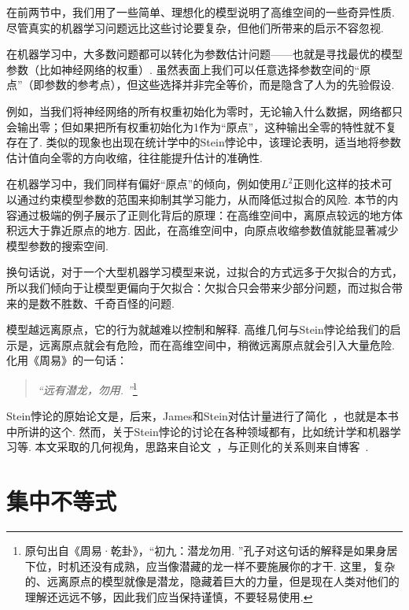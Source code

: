 在前两节中，我们用了一些简单、理想化的模型说明了高维空间的一些奇异性质. 尽管真实的机器学习问题远比这些讨论要复杂，但他们所带来的启示不容忽视. 

在机器学习中，大多数问题都可以转化为参数估计问题——也就是寻找最优的模型参数（比如神经网络的权重）. 虽然表面上我们可以任意选择参数空间的“原点”（即参数的参考点），但这些选择并非完全等价，而是隐含了人为的先验假设. 

例如，当我们将神经网络的所有权重初始化为零时，无论输入什么数据，网络都只会输出零；但如果把所有权重初始化为1作为“原点”，这种输出全零的特性就不复存在了. 类似的现象也出现在统计学中的Stein悖论中，该理论表明，适当地将参数估计值向全零的方向收缩，往往能提升估计的准确性. 

在机器学习中，我们同样有偏好“原点”的倾向，例如使用$L^2$正则化这样的技术可以通过约束模型参数的范围来抑制其学习能力，从而降低过拟合的风险. 本节的内容通过极端的例子展示了正则化背后的原理：在高维空间中，离原点较远的地方体积远大于靠近原点的地方. 因此，在高维空间中，向原点收缩参数值就能显著减少模型参数的搜索空间. 

换句话说，对于一个大型机器学习模型来说，过拟合的方式远多于欠拟合的方式，所以我们倾向于让模型更偏向于欠拟合：欠拟合只会带来少部分问题，而过拟合带来的是数不胜数、千奇百怪的问题. 

模型越远离原点，它的行为就越难以控制和解释. 高维几何与Stein悖论给我们的启示是，远离原点就会有危险，而在高维空间中，稍微远离原点就会引入大量危险. 化用《周易》的一句话：
\begin{quotation}
    \textit{“远有潜龙，勿用. ”}\footnote{原句出自《周易·乾卦》，“初九：潜龙勿用. ”孔子对这句话的解释是如果身居下位，时机还没有成熟，应当像潜藏的龙一样不要施展你的才干. 这里，复杂的、远离原点的模型就像是潜龙，隐藏着巨大的力量，但是现在人类对他们的理解还远远不够，因此我们应当保持谨慎，不要轻易使用. }
\end{quotation}

\begin{remark}
    Stein悖论的原始论文是\cite{steinInadmissibilityUsualEstimator1956}，后来，James和Stein对估计量进行了简化~\cite{jamesEstimationQuadraticLoss1961}，也就是本书中所讲的这个. 然而，关于Stein悖论的讨论在各种领域都有，比如统计学和机器学习等. 本文采取的几何视角，思路来自论文~\cite{brownGeometricalExplanationStein2012}，与正则化的关系则来自博客~\cite{UnderstandingSteinsParadox}. 
\end{remark}

\section{集中不等式}

